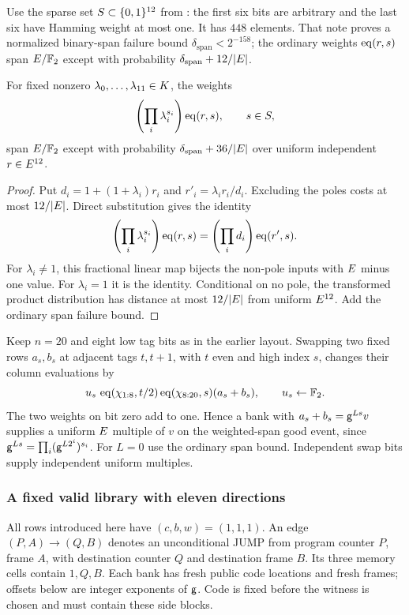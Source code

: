 Use the sparse set $S\subset\{0,1\}^{12}$ from : the first six bits are arbitrary and the last six have Hamming weight at most one. It has $448$ elements. That note proves a normalized binary-span failure bound $\delta_{\mathrm{span}}<2^{-158}$; the ordinary weights $\operatorname{eq}(r,s)$ span $E/\mathbb F_2$ except with probability $\delta_{\mathrm{span}}+12/|E|$.

\begin{lemma}\label{lem:metadata-span}
For fixed nonzero $\lambda_0,\ldots,\lambda_{11}\in K$, the weights
\[
 \left(\prod_i\lambda_i^{s_i}\right)\operatorname{eq}(r,s),\qquad s\in S,
\]
span $E/\mathbb F_2$ except with probability $\delta_{\mathrm{span}}+36/|E|$ over uniform independent $r\in E^{12}$.
\end{lemma}
\begin{proof}
Put $d_i=1+(1+\lambda_i)r_i$ and $r'_i=\lambda_i r_i/d_i$. Excluding the poles costs at most $12/|E|$. Direct substitution gives the identity
\[
 \left(\prod_i\lambda_i^{s_i}\right)\operatorname{eq}(r,s)
 =\left(\prod_i d_i\right)\operatorname{eq}(r',s).
\]
For $\lambda_i\ne1$, this fractional linear map bijects the non-pole inputs with $E$ minus one value. For $\lambda_i=1$ it is the identity. Conditional on no pole, the transformed product distribution has distance at most $12/|E|$ from uniform $E^{12}$. Add the ordinary span failure bound.
\end{proof}

Keep $n=20$ and eight low tag bits as in the earlier layout. Swapping two fixed rows $a_s,b_s$ at adjacent tags $t,t+1$, with $t$ even and high index $s$, changes their column evaluations by
\[
 u_s\,\operatorname{eq}(\chi_{1:8},t/2)\operatorname{eq}(\chi_{8:20},s)(a_s+b_s),
 \qquad u_s\gets\mathbb F_2.
\]
The two weights on bit zero add to one. Hence a bank with $a_s+b_s=\mathsf{g}^{Ls}v$ supplies a uniform $E$ multiple of $v$ on the weighted-span good event, since $\mathsf{g}^{Ls}=\prod_i(\mathsf{g}^{L2^i})^{s_i}$. For $L=0$ use the ordinary span bound. Independent swap bits supply independent uniform multiples.

\subsubsection{A fixed valid library with eleven directions}

All rows introduced here have $(c,b,w)=(1,1,1)$. An edge $(P,A)\to(Q,B)$ denotes an unconditional JUMP from program counter $P$, frame $A$, with destination counter $Q$ and destination frame $B$. Its three memory cells contain $1,Q,B$. Each bank has fresh public code locations and fresh frames; offsets below are integer exponents of $\mathsf{g}$. Code is fixed before the witness is chosen and must contain these side blocks.

